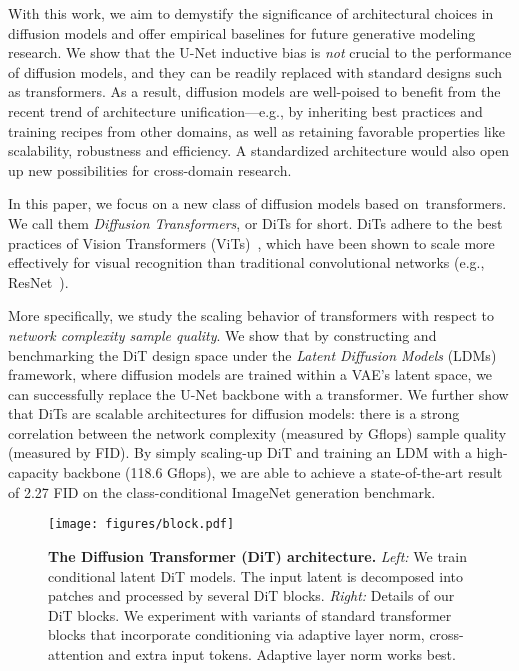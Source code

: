 \documentclass[10pt,twocolumn,letterpaper]{article}
\begin{document}
With this work, we aim to demystify the significance of architectural choices in diffusion models and offer empirical baselines for future generative modeling research. We show that the U-Net inductive bias is \emph{not} crucial to the performance of diffusion models, and they can be readily replaced with standard designs such as transformers. As a result, diffusion models are well-poised to benefit from the recent trend of architecture unification---e.g., by inheriting best practices and training recipes from other domains, as well as retaining favorable properties like scalability, robustness and efficiency. A standardized architecture would also open up new possibilities for cross-domain research.

In this paper, we focus on a new class of diffusion models based on transformers. We call them \textit{Diffusion Transformers}, or DiTs for short. DiTs adhere to the best practices of Vision Transformers (ViTs)~\cite{Dosovitskiy2020}, which have been shown to scale more effectively for visual recognition than traditional convolutional networks (e.g., ResNet~\cite{He2016}).

More specifically, we study the scaling behavior of transformers with respect to \emph{network complexity \vs sample quality}. We show that by constructing and benchmarking the DiT design space under the \emph{Latent Diffusion Models} (LDMs)~\cite{rombach2021highresolution} framework, where diffusion models are trained within a VAE's latent space, we can successfully replace the U-Net backbone with a transformer. We further show that DiTs are scalable architectures for diffusion models: there is a strong correlation between the network complexity (measured by Gflops) \vs sample quality (measured by FID). By simply scaling-up DiT and training an LDM with a high-capacity backbone (118.6 Gflops), we are able to achieve a state-of-the-art result of 2.27 FID on the class-conditional  ImageNet generation benchmark. 
\vspace{-2mm}

\begin{figure*}\centering
\texttt{[image: figures/block.pdf]}
\caption{\textbf{The Diffusion Transformer (DiT) architecture.} \emph{Left:} We train conditional latent DiT models. The input latent is decomposed into patches and processed by several DiT blocks. \emph{Right:} Details of our DiT blocks. We experiment with variants of standard transformer blocks that incorporate conditioning via adaptive layer norm, cross-attention and extra input tokens. Adaptive layer norm works best.}\vspace{-2mm}
\label{fig:architecture}\vspace{-2mm}
\end{figure*}
\end{document}
